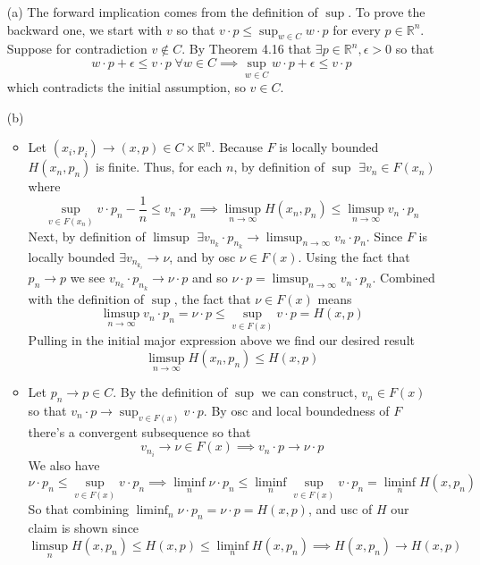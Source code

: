\documentclass{article}
\newenvironment{ex}[1]
  {\renewcommand\theexercise{#1}\exercise}
  {\endexercise}
\newcommand{\R}[1]{\mathbb{R}^{#1}}
\newcommand{\idot}[2]{#1 \cdot #2}
\begin{document}
\begin{ex}{5.4} %
  \begin{enumerate}
    \item[(a)]
      The forward implication comes from the definition of $\sup$. To prove the backward one, we start with $v$ so that $\idot{v}{p} \le \sup_{w \in C} \idot{w}{p}$ for every $p \in \R{n}$. Suppose for contradiction $v \not\in C$. By Theorem 4.16 that $\exists p \in \R{n}, \epsilon > 0$ so that
      $$
      \idot{w}{p} + \epsilon \le \idot{v}{p} \; \forall w \in C \implies \sup_{w\in C} \idot{w}{p} + \epsilon \le \idot{v}{p}
      $$
      which contradicts the initial assumption, so $v \in C$.
    \item[(b)]
      \begin{itemize}
        \item
          Let $(x_i, p_i) \to (x, p) \in C \times \R{n}$. Because $F$ is locally bounded $H(x_n, p_n)$ is finite. Thus, for each $n$, by definition of $\sup$ $\exists v_n \in F(x_n)$ where
          $$
          \sup_{v \in F(x_n)} \idot{v}{p_n} - \frac{1}{n} \le \idot{v_n}{p_n} \implies \limsup_{n \to \infty} H(x_n, p_n) \le \limsup_{n \to \infty} \idot{v_n}{p_n}
          $$
          Next, by definition of $\limsup$ $\exists \idot{v_{n_k}}{p_{n_k}} \to \limsup_{n \to \infty} \idot{v_n}{p_n}$. Since $F$ is locally bounded $\exists v_{n_{k_i}} \to \nu$, and by osc $\nu \in F(x)$. Using the fact that $p_n \to p$ we see $\idot{v_{n_k}}{p_{n_k}} \to \idot{\nu}{p}$ and so $\idot{\nu}{p} = \limsup_{n \to \infty} \idot{v_n}{p_n}$. Combined with the definition of $\sup$, the fact that $\nu \in F(x)$ means
          $$
          \limsup_{n \to \infty} \idot{v_n}{p_n} = \idot{\nu}{p} \le \sup_{v \in F(x)} \idot{v}{p} = H(x, p)
          $$
          Pulling in the initial major expression above we find our desired result
          $$
          \limsup_{n \to \infty} H(x_n, p_n) \le H(x, p)
          $$
        \item
          Let $p_n \to p \in C$. By the definition of $\sup$ we can construct, $v_n \in F(x)$ so that $\idot{v_n}{p} \to \sup_{v \in F(x)} \idot{v}{p}$. By osc and local boundedness of $F$ there's a convergent subsequence so that
          $$
          v_{n_i} \to \nu \in F(x) \implies \idot{v_n}{p} \to \idot{\nu}{p}
          $$
          We also have
          $$
          \idot{\nu}{p_n} \le \sup_{v \in F(x)} \idot{v}{p_n} \implies \liminf_n \idot{\nu}{p_n} \le \liminf_n \sup_{v \in F(x)} \idot{v}{p_n} = \liminf_n H(x, p_n)
          $$
          So that combining $\liminf_n \idot{\nu}{p_n} = \idot{\nu}{p} = H(x, p)$, and usc of $H$ our claim is shown since
          $$
          \limsup_n H(x, p_n) \le H(x, p) \le \liminf_n H(x, p_n) \implies H(x, p_n) \to H(x, p)
          $$
      \end{itemize}
  \end{enumerate}
\end{ex} %
\begin{ex}{5.12} %
\end{ex} %
\begin{ex}{5.13} %
\end{ex} %
\begin{ex}{5.14} %
\end{ex} %
\begin{ex}{5.24} %
\end{ex} %
\begin{ex}{5.27} %
\end{ex} %
\end{document}
